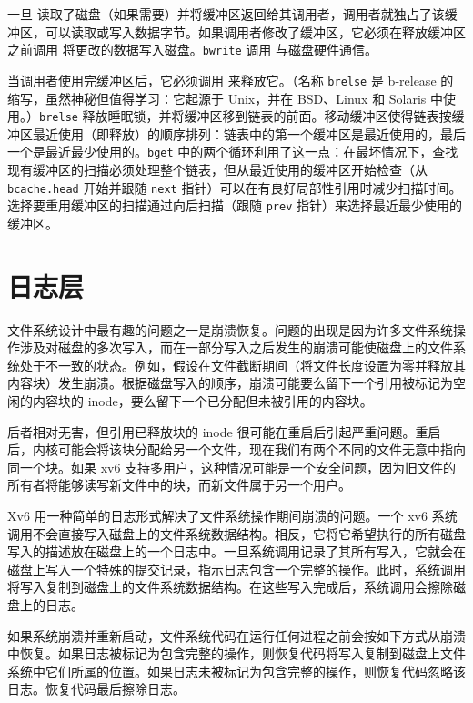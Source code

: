 一旦  读取了磁盘（如果需要）并将缓冲区返回给其调用者，调用者就独占了该缓冲区，可以读取或写入数据字节。如果调用者修改了缓冲区，它必须在释放缓冲区之前调用  将更改的数据写入磁盘。\lstinline{bwrite} 调用  与磁盘硬件通信。

当调用者使用完缓冲区后，它必须调用  来释放它。（名称 \lstinline{brelse} 是 b-release 的缩写，虽然神秘但值得学习：它起源于 Unix，并在 BSD、Linux 和 Solaris 中使用。）\lstinline{brelse} 释放睡眠锁，并将缓冲区移到链表的前面。移动缓冲区使得链表按缓冲区最近使用（即释放）的顺序排列：链表中的第一个缓冲区是最近使用的，最后一个是最近最少使用的。\lstinline{bget} 中的两个循环利用了这一点：在最坏情况下，查找现有缓冲区的扫描必须处理整个链表，但从最近使用的缓冲区开始检查（从 \lstinline{bcache.head} 开始并跟随 \lstinline{next} 指针）可以在有良好局部性引用时减少扫描时间。选择要重用缓冲区的扫描通过向后扫描（跟随 \lstinline{prev} 指针）来选择最近最少使用的缓冲区。
\section{日志层}

文件系统设计中最有趣的问题之一是崩溃恢复。问题的出现是因为许多文件系统操作涉及对磁盘的多次写入，而在一部分写入之后发生的崩溃可能使磁盘上的文件系统处于不一致的状态。例如，假设在文件截断期间（将文件长度设置为零并释放其内容块）发生崩溃。根据磁盘写入的顺序，崩溃可能要么留下一个引用被标记为空闲的内容块的 inode，要么留下一个已分配但未被引用的内容块。

后者相对无害，但引用已释放块的 inode 很可能在重启后引起严重问题。重启后，内核可能会将该块分配给另一个文件，现在我们有两个不同的文件无意中指向同一个块。如果 xv6 支持多用户，这种情况可能是一个安全问题，因为旧文件的所有者将能够读写新文件中的块，而新文件属于另一个用户。

Xv6 用一种简单的日志形式解决了文件系统操作期间崩溃的问题。一个 xv6 系统调用不会直接写入磁盘上的文件系统数据结构。相反，它将它希望执行的所有磁盘写入的描述放在磁盘上的一个日志中。一旦系统调用记录了其所有写入，它就会在磁盘上写入一个特殊的提交记录，指示日志包含一个完整的操作。此时，系统调用将写入复制到磁盘上的文件系统数据结构。在这些写入完成后，系统调用会擦除磁盘上的日志。

如果系统崩溃并重新启动，文件系统代码在运行任何进程之前会按如下方式从崩溃中恢复。如果日志被标记为包含完整的操作，则恢复代码将写入复制到磁盘上文件系统中它们所属的位置。如果日志未被标记为包含完整的操作，则恢复代码忽略该日志。恢复代码最后擦除日志。

